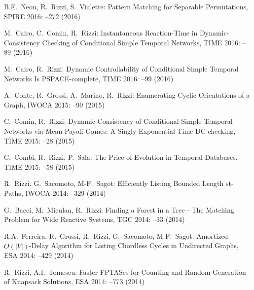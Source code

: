 \begin{etaremune}
  \item {\sc B.E.~Neou, R.~Rizzi, S.~Vialette:}
   \newblock Pattern Matching for Separable Permutations,
   \newblock SPIRE 2016:
   --272 (2016)

  \item {\sc M.~Cairo, C.~Comin, R.~Rizzi:}
   \newblock Instantaneous Reaction-Time in Dynamic-Consistency Checking of Conditional Simple Temporal Networks,
   \newblock TIME 2016:
   --89 (2016)

  \item {\sc M.~Cairo, R.~Rizzi:}
   \newblock Dynamic Controllability of Conditional Simple Temporal Networks Is PSPACE-complete,
   \newblock TIME 2016:
   --99 (2016)

  \item {\sc A.~Conte, R.~Grossi, A.~Marino, R.~Rizzi:}
   \newblock Enumerating Cyclic Orientations of a Graph,
   \newblock IWOCA 2015:
   --99 (2015)

  \item {\sc C.~Comin, R.~Rizzi:}
   \newblock Dynamic Consistency of Conditional Simple Temporal Networks via Mean Payoff Games: A Singly-Exponential Time DC-checking,
   \newblock TIME 2015:
   --28 (2015)

  \item {\sc C.~Combi, R.~Rizzi, P.~Sala:}
   \newblock The Price of Evolution in Temporal Databases,
   \newblock TIME 2015:
   --58 (2015)

  \item {\sc R.~Rizzi, G.~Sacomoto, M-F.~Sagot:}
   \newblock Efficiently Listing Bounded Length st-Paths,
   \newblock IWOCA 2014:
   --329 (2014)

  \item {G.~Bacci, M.~Miculan, R.~Rizzi:}
   \newblock Finding a Forest in a Tree - The Matching Problem for Wide Reactive Systems,
   \newblock TGC 2014:
   --33 (2014)

  \item {R.A.~Ferreira, R.~Grossi, R.~Rizzi, G.~Sacomoto, M-F.~Sagot:}
   \newblock Amortized $\tilde{O}(|V|)$-Delay Algorithm for Listing Chordless Cycles in Undirected Graphs,
   \newblock ESA 2014:
   --429 (2014)

  \item {R.~Rizzi, A.I.~Tomescu:}
   \newblock Faster FPTASes for Counting and Random Generation of Knapsack Solutions,
   \newblock ESA 2014:
   --773 (2014)


\end{etaremune}
